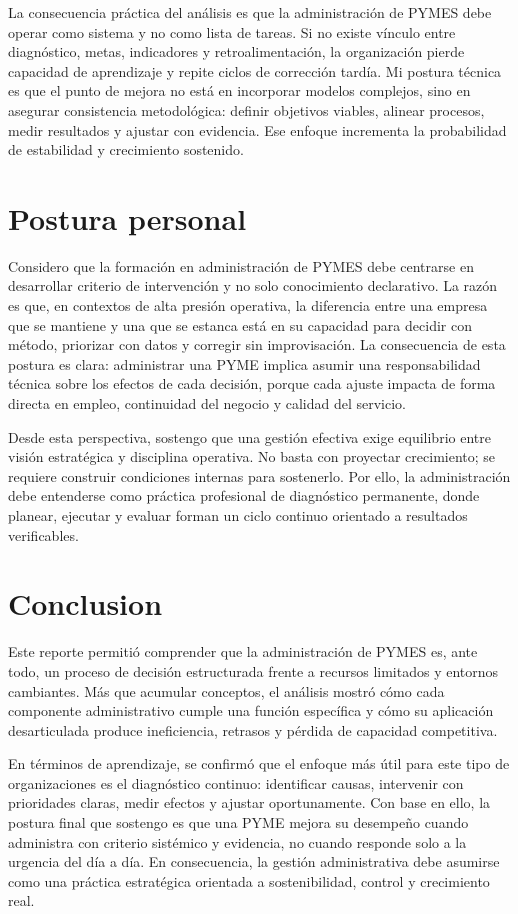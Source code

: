 \documentclass[
	spanish,
	letterpaper, oneside
]{article}
\begin{document}
La consecuencia práctica del análisis es que la administración de PYMES debe operar como sistema y no como lista de tareas. Si no existe vínculo entre diagnóstico, metas, indicadores y retroalimentación, la organización pierde capacidad de aprendizaje y repite ciclos de corrección tardía. Mi postura técnica es que el punto de mejora no está en incorporar modelos complejos, sino en asegurar consistencia metodológica: definir objetivos viables, alinear procesos, medir resultados y ajustar con evidencia. Ese enfoque incrementa la probabilidad de estabilidad y crecimiento sostenido.

\section{Postura personal}

Considero que la formación en administración de PYMES debe centrarse en desarrollar criterio de intervención y no solo conocimiento declarativo. La razón es que, en contextos de alta presión operativa, la diferencia entre una empresa que se mantiene y una que se estanca está en su capacidad para decidir con método, priorizar con datos y corregir sin improvisación. La consecuencia de esta postura es clara: administrar una PYME implica asumir una responsabilidad técnica sobre los efectos de cada decisión, porque cada ajuste impacta de forma directa en empleo, continuidad del negocio y calidad del servicio.

Desde esta perspectiva, sostengo que una gestión efectiva exige equilibrio entre visión estratégica y disciplina operativa. No basta con proyectar crecimiento; se requiere construir condiciones internas para sostenerlo. Por ello, la administración debe entenderse como práctica profesional de diagnóstico permanente, donde planear, ejecutar y evaluar forman un ciclo continuo orientado a resultados verificables.

\section{Conclusion}

Este reporte permitió comprender que la administración de PYMES es, ante todo, un proceso de decisión estructurada frente a recursos limitados y entornos cambiantes. Más que acumular conceptos, el análisis mostró cómo cada componente administrativo cumple una función específica y cómo su aplicación desarticulada produce ineficiencia, retrasos y pérdida de capacidad competitiva.

En términos de aprendizaje, se confirmó que el enfoque más útil para este tipo de organizaciones es el diagnóstico continuo: identificar causas, intervenir con prioridades claras, medir efectos y ajustar oportunamente. Con base en ello, la postura final que sostengo es que una PYME mejora su desempeño cuando administra con criterio sistémico y evidencia, no cuando responde solo a la urgencia del día a día. En consecuencia, la gestión administrativa debe asumirse como una práctica estratégica orientada a sostenibilidad, control y crecimiento real.



\end{document}
